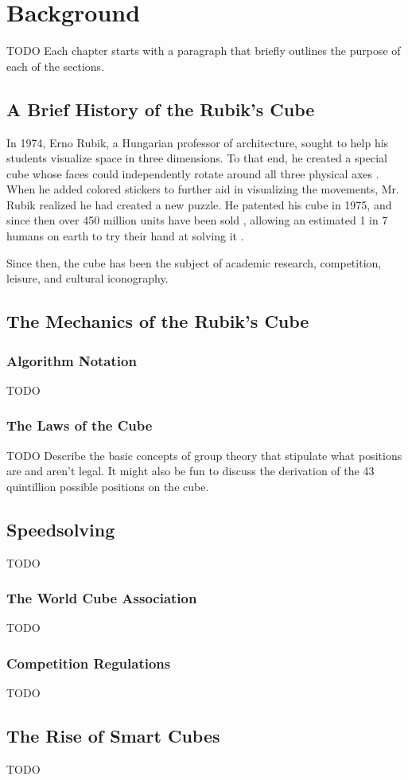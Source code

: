 
\chapter{Background} %

\label{Chapter2} %

TODO Each chapter starts with a paragraph that briefly outlines the purpose of each of the sections.


\section{A Brief History of the Rubik's Cube}

In 1974, Erno Rubik, a Hungarian professor of architecture, sought to help his students visualize space in three dimensions. 
To that end, he created a special cube whose faces could independently rotate around all three physical axes \cite{rubik-motivation}.
When he added colored stickers to further aid in visualizing the movements, Mr. Rubik realized he had created a new puzzle.
He patented his cube in 1975, \cite{rubik-patent} and since then over 450 million units have been sold \cite{forbes-rubik-merger}, allowing an estimated 1 in 7 humans on earth to try their hand at solving it \cite{rubik-population-reached}.

Since then, the cube has been the subject of academic research, competition, leisure, and cultural iconography.


\section{The Mechanics of the Rubik's Cube}



\subsection{Algorithm Notation}
TODO

\subsection{The Laws of the Cube}
TODO Describe the basic concepts of group theory that stipulate what positions are and aren't legal. It might also be fun to discuss the derivation of the 43 quintillion possible positions on the cube.


\section{Speedsolving}

TODO

\subsection{The World Cube Association}
TODO

\subsection{Competition Regulations}
TODO


\section{The Rise of Smart Cubes}

TODO